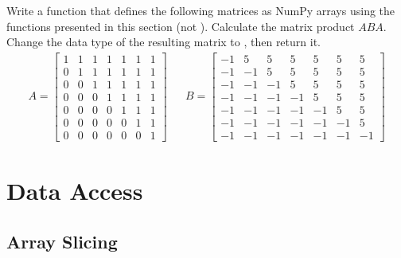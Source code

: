 \begin{problem} %
Write a function that defines the following matrices as NumPy arrays using the functions presented in this section (not ).
Calculate the matrix product $ABA$.
Change the data type of the resulting matrix to , then return it.
\begin{align*}
A = \left[\begin{array}{rrrrrrr}
1 & 1 & 1 & 1 & 1 & 1 & 1\\
0 & 1 & 1 & 1 & 1 & 1 & 1\\
0 & 0 & 1 & 1 & 1 & 1 & 1\\
0 & 0 & 0 & 1 & 1 & 1 & 1\\
0 & 0 & 0 & 0 & 1 & 1 & 1\\
0 & 0 & 0 & 0 & 0 & 1 & 1\\
0 & 0 & 0 & 0 & 0 & 0 & 1\end{array}\right]
&&
B = \left[\begin{array}{rrrrrrr}
-1 &  5 &  5 &  5 &  5 &  5 &  5\\
-1 & -1 &  5 &  5 &  5 &  5 &  5\\
-1 & -1 & -1 &  5 &  5 &  5 &  5\\
-1 & -1 & -1 & -1 &  5 &  5 &  5\\
-1 & -1 & -1 & -1 & -1 &  5 &  5\\
-1 & -1 & -1 & -1 & -1 & -1 &  5\\
-1 & -1 & -1 & -1 & -1 & -1 & -1\end{array}\right]
\end{align*}
\end{problem}

\section*{Data Access} %

\subsection*{Array Slicing} %


